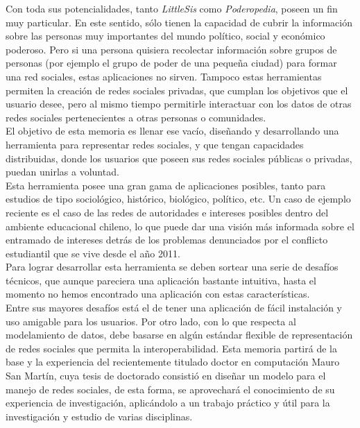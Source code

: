 \begin{intro}
  Con toda sus potencialidades, tanto \emph{LittleSis} como \emph{Poderopedia}, poseen un fin muy particular. En este sentido, sólo tienen la capacidad de cubrir la información sobre las personas muy importantes del mundo político, social y económico poderoso. Pero si una persona quisiera recolectar información sobre grupos de personas (por ejemplo el grupo de poder de una pequeña ciudad) para formar una red sociales, estas aplicaciones no sirven. Tampoco estas herramientas permiten la creación de redes sociales privadas, que cumplan los objetivos que el usuario desee, pero al mismo tiempo permitirle interactuar con los datos de otras redes sociales pertenecientes a otras personas o comunidades.\\

  El objetivo de esta memoria es llenar ese vacío, diseñando y desarrollando una herramienta para representar redes sociales, y que tengan capacidades distribuidas, donde los usuarios que poseen sus redes sociales públicas o privadas, puedan unirlas a voluntad.\\

  Esta herramienta posee una gran gama de aplicaciones posibles, tanto para estudios de tipo sociológico, histórico, biológico, político, etc. Un caso de ejemplo reciente es el caso de las redes de autoridades e intereses posibles dentro del ambiente educacional chileno, lo que puede dar una visión más informada sobre el entramado de intereses detrás de los problemas denunciados por el conflicto estudiantil que se vive desde el año 2011.\\

  Para lograr desarrollar esta herramienta se deben sortear una serie de desafíos técnicos, que aunque pareciera una aplicación bastante intuitiva, hasta el momento no hemos encontrado una aplicación con estas características.\\

  Entre sus mayores desafíos está el de tener una aplicación de fácil instalación y uso amigable para los usuarios. Por otro lado, con lo que respecta al modelamiento de datos, debe basarse en algún estándar flexible de representación de redes sociales que permita la interoperabilidad. Esta memoria partirá de la base y la experiencia del recientemente titulado doctor en computación Mauro San Martín, cuya tesis de doctorado consistió en diseñar un modelo para el manejo de redes sociales, de esta forma, se aprovechará el conocimiento de su experiencia de investigación, aplicándolo a un trabajo práctico y útil para la investigación y estudio de varias disciplinas.\\


\end{intro}
